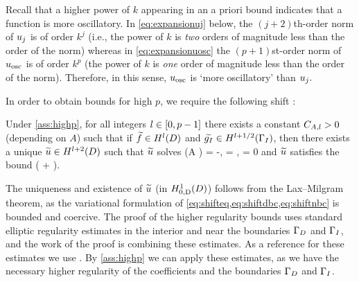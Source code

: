 \label{rem:osc}
Recall that a higher power of $k$ appearing in an a priori bound indicates that a function is more oscillatory. In \cref{eq:expansionuj} below, the $(j+2)$th-order norm of $u_{j}$ is of order $k^j$ (i.e., the power of $k$ is \emph{two} orders of magnitude less than the order of the norm) whereas in \cref{eq:expansionuosc} the $(p+1)$st-order norm of $u_{\mathrm{osc}}$ is of order $k^p$ (the power of $k$ is \emph{one} order of magnitude less than the order of the norm). Therefore, in this sense, $u_{\mathrm{osc}}$ is `more oscillatory' than $u_{j}.$
\ere



In order to obtain bounds for high $p$, we require the following shift :

\label{thm:shift}
Under \cref{ass:highp}, for all integers $l \in \mleft[0,p-1\mright]$ there exists a constant $C_{A,l}>0$ (depending on $A$) such that if $\ftilde \in \HlD$ and $\gItilde \in \HlphGI$, then there exists a unique $\utilde \in \HlptD$ such that $\widetilde{u}$ solves
\beq\label{eq:shifteq}
\grad \cdot \mleft(A \grad \utilde\mright) = -\ftilde,
\eeq
\beq\label{eq:shiftdbc}
\dn \utilde = \gItilde, \tand
\eeq
\beq\label{eq:shiftnbc}
\trD \utilde = 0
\eeq
and $\widetilde{u}$ satisfies the bound
\beq\label{eq:shift}
\NHlptD{\utilde} \leq \CAl \mleft(\NHlD{\ftilde} + \NHlphGI{\gItilde}\mright).
\eeq
\enth

The uniqueness and existence of $\widetilde{u}$ (in $\HozDD$) follows from the Lax--Milgram theorem, as the variational formulation of \cref{eq:shifteq,eq:shiftdbc,eq:shiftnbc} is bounded and coercive. The proof of the higher regularity bounds uses standard elliptic regularity estimates in the interior and near the boundaries $\Gamma_{D}$ and $\Gamma_{I}$, and the work of the proof is combining these estimates. As a reference for these estimates we use \cite[pp. 137-138]{Mc:00}. By \cref{ass:highp} we can apply these estimates, as we have the necessary higher regularity of the coefficients and the boundaries $\Gamma_{D}$ and $\Gamma_{I}$.


